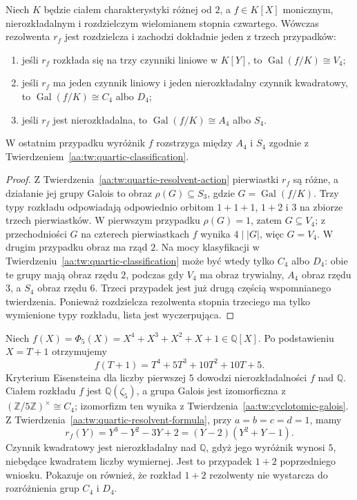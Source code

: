 \begin{wniosek}
\label{aa:wn:quartic-resolvent-factorization}
Niech $K$ będzie ciałem charakterystyki różnej od $2$,
a $f\in K[X]$ monicznym, nierozkładalnym i rozdzielczym
wielomianem stopnia czwartego. Wówczas rezolwenta $r_f$
jest rozdzielcza i zachodzi dokładnie jeden z trzech przypadków:
\begin{enumerate}
\item jeśli $r_f$ rozkłada się na trzy czynniki liniowe w $K[Y]$,
      to $\operatorname{Gal}(f/K)\cong V_4$;
\item jeśli $r_f$ ma jeden czynnik liniowy i jeden nierozkładalny
      czynnik kwadratowy, to $\operatorname{Gal}(f/K)\cong C_4$
      albo $D_4$;
\item jeśli $r_f$ jest nierozkładalna, to
      $\operatorname{Gal}(f/K)\cong A_4$ albo $S_4$.
\end{enumerate}
W ostatnim przypadku wyróżnik $f$ rozstrzyga między $A_4$
i $S_4$ zgodnie z Twierdzeniem~\ref{aa:tw:quartic-classification}.
\end{wniosek}
\begin{proof}
Z Twierdzenia~\ref{aa:tw:quartic-resolvent-action} pierwiastki
$r_f$ są różne, a działanie jej grupy Galois to obraz
$\rho(G)\subseteq S_3$, gdzie $G=\operatorname{Gal}(f/K)$.
Trzy typy rozkładu odpowiadają odpowiednio orbitom
$1+1+1$, $1+2$ i $3$ na zbiorze trzech pierwiastków.
W pierwszym przypadku $\rho(G)=1$, zatem $G\subseteq V_4$;
z przechodniości $G$ na czterech pierwiastkach $f$ wynika
$4\mid |G|$, więc $G=V_4$. W drugim przypadku obraz
ma rząd $2$. Na mocy klasyfikacji w
Twierdzeniu~\ref{aa:tw:quartic-classification} może być wtedy
tylko $C_4$ albo $D_4$: obie te grupy mają obraz rzędu $2$,
podczas gdy $V_4$ ma obraz trywialny, $A_4$ obraz rzędu $3$,
a $S_4$ obraz rzędu $6$.
Trzeci przypadek jest już drugą częścią wspomnianego twierdzenia.
Ponieważ rozdzielcza rezolwenta stopnia trzeciego ma tylko
wymienione typy rozkładu, lista jest wyczerpująca.
\end{proof}

\begin{przyklad}\label{aa:prz:quartic-c4}
Niech $f(X)=\Phi_5(X)=X^4+X^3+X^2+X+1\in\mathbb Q[X]$.
Po podstawieniu $X=T+1$ otrzymujemy
\[
 f(T+1)=T^4+5T^3+10T^2+10T+5.
\]
Kryterium Eisensteina dla liczby pierwszej $5$ dowodzi
nierozkładalności $f$ nad $\mathbb Q$.
Ciałem rozkładu $f$ jest $\mathbb Q(\zeta_5)$, a grupa Galois
jest izomorficzna z
$(\mathbb Z/5\mathbb Z)^\times\cong C_4$;
izomorfizm ten wynika z
Twierdzenia~\ref{aa:tw:cyclotomic-galois}.
Z Twierdzenia~\ref{aa:tw:quartic-resolvent-formula},
przy $a=b=c=d=1$, mamy
\[
 r_f(Y)=Y^3-Y^2-3Y+2=(Y-2)(Y^2+Y-1).
\]
Czynnik kwadratowy jest nierozkładalny nad $\mathbb Q$,
gdyż jego wyróżnik wynosi $5$, niebędące kwadratem
liczby wymiernej. Jest to przypadek $1+2$ poprzedniego
wniosku. Pokazuje on również, że rozkład $1+2$
rezolwenty nie wystarcza do rozróżnienia grup $C_4$ i $D_4$.
\end{przyklad}

